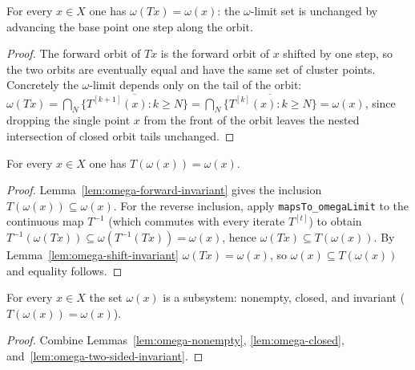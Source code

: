 \begin{lemma}
    \label{lem:omega-shift-invariant}
    \leanok
    For every $x \in X$ one has $\omega(T x) = \omega(x)$: the $\omega$-limit set
    is unchanged by advancing the base point one step along the orbit.
\end{lemma}
\begin{proof}
    The forward orbit of $Tx$ is the forward orbit of $x$ shifted by one step,
    so the two orbits are eventually equal and have the same set of cluster
    points. Concretely the $\omega$-limit depends only on the tail of the orbit:
    $\omega(Tx) = \bigcap_N \overline{\{T^{[k+1]}(x) : k \ge N\}}
    = \bigcap_N \overline{\{T^{[k]}(x) : k \ge N\}} = \omega(x)$, since dropping
    the single point $x$ from the front of the orbit leaves the nested
    intersection of closed orbit tails unchanged.
\end{proof}

\begin{lemma}
    \label{lem:omega-two-sided-invariant}
    \leanok
    For every $x \in X$ one has $T(\omega(x)) = \omega(x)$.
\end{lemma}
\begin{proof}
    Lemma~\ref{lem:omega-forward-invariant} gives the inclusion
    $T(\omega(x)) \subseteq \omega(x)$. For the reverse inclusion, apply
    \texttt{mapsTo\_omegaLimit} to the continuous map $T^{-1}$ (which commutes
    with every iterate $T^{[t]}$) to obtain
    $T^{-1}(\omega(Tx)) \subseteq \omega(T^{-1}(Tx)) = \omega(x)$, hence
    $\omega(Tx) \subseteq T(\omega(x))$. By
    Lemma~\ref{lem:omega-shift-invariant} $\omega(Tx) = \omega(x)$, so
    $\omega(x) \subseteq T(\omega(x))$ and equality follows.
\end{proof}

\begin{lemma}
    \label{lem:omega-limit-properties}
    \leanok
    For every $x \in X$ the set $\omega(x)$ is a subsystem: nonempty, closed, and
    invariant ($T(\omega(x)) = \omega(x)$).
\end{lemma}
\begin{proof}
    Combine Lemmas~\ref{lem:omega-nonempty}, \ref{lem:omega-closed},
    and~\ref{lem:omega-two-sided-invariant}.
\end{proof}


